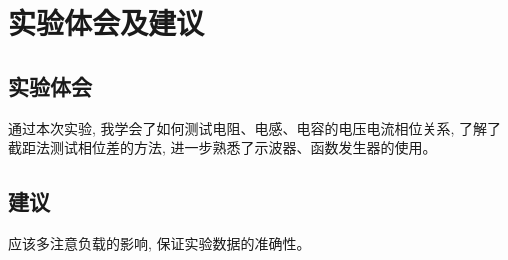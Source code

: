 \documentclass[10pt, a4paper]{article} %
\begin{document}
\section{实验体会及建议}
\subsection{实验体会}
通过本次实验, 我学会了如何测试电阻、电感、电容的电压电流相位关系, 了解了截距法测试相位差的方法, 进一步熟悉了示波器、函数发生器的使用。
\subsection{建议}
应该多注意负载的影响, 保证实验数据的准确性。
\end{document}
